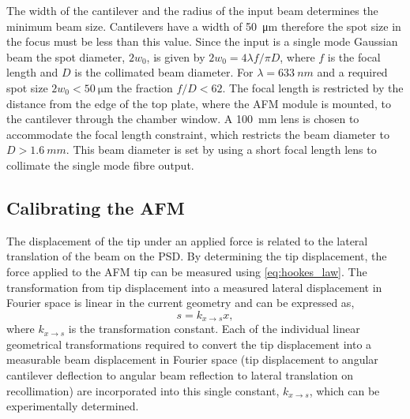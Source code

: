 \documentclass{article}
\begin{document}
The width of the cantilever and the radius of the input beam determines the minimum beam size. Cantilevers have a width of \SI{50}{\micro\metre} therefore the spot size in the focus must be less than this value. Since the input is a single mode Gaussian beam the spot diameter, $2w_0$, is given by $2w_0 = 4\lambda f/ \pi D$, where $f$ is the focal length and $D$ is the collimated beam diameter. For $\lambda=\SI{633}{nm}$ and a required spot size $2w_0 < \SI{50}{\micro\metre}$ the fraction $f/D < 62$. The focal length is restricted by the distance from the edge of the top plate, where the AFM module is mounted, to the cantilever through the chamber window. A \SI{100}{mm} lens is chosen to accommodate the focal length constraint, which restricts the beam diameter to $D > \SI{1.6}{mm}$. This beam diameter is set by using a short focal length lens to collimate the single mode fibre output.

\subsection{Calibrating the AFM}

The displacement of the tip under an applied force is related to the lateral translation of the beam on the PSD. By determining the tip displacement, the force applied to the AFM tip can be measured using \eqref{eq:hookes_law}. The transformation from tip displacement into a measured lateral displacement in Fourier space is linear in the current geometry and can be expressed as,
\begin{equation}
s = k_{x \rightarrow s}x,
\end{equation}
where $k_{x \rightarrow s}$ is the transformation constant. Each of the individual linear geometrical transformations required to convert the tip displacement into a measurable beam displacement in Fourier space (tip displacement to angular cantilever deflection to angular beam reflection to lateral translation on recollimation) are incorporated into this single constant, $k_{x \rightarrow s}$, which can be experimentally determined.
\end{document}
